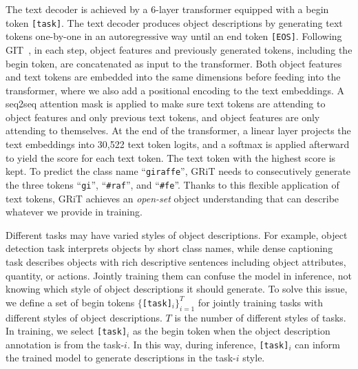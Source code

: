 \documentclass[10pt,twocolumn,letterpaper]{article}
\begin{document}
The text decoder is achieved by a 6-layer transformer equipped with a begin token \texttt{[task]}. The text decoder produces object descriptions by generating text tokens one-by-one in an autoregressive way until an end token \texttt{[EOS]}. Following GIT~\cite{wang2022git}, in each step, object features and previously generated tokens, including the begin token, are concatenated as input to the transformer. Both object features and text tokens are embedded into the same dimensions before feeding into the transformer, where we also add a positional encoding to the text embeddings. A seq2seq attention mask is applied to make sure text tokens are attending to object features and only previous text tokens, and object features are only attending to themselves.  At the end of the transformer, a linear layer projects the text embeddings into 30,522 text token logits, and a softmax is applied afterward to yield the score for each text token. The text token with the highest score is kept. To predict the class name ``\texttt{giraffe}'', GRiT needs to consecutively generate the three tokens ``\texttt{gi}'', ``\texttt{\#raf}'', and ``\texttt{\#fe}''. Thanks to this flexible application of text tokens, GRiT achieves an \emph{open-set} object understanding that can describe whatever we provide in training. 

Different tasks may have varied styles of object descriptions. For example, object detection task interprets objects by short class names, while dense captioning task describes objects with rich descriptive sentences including object attributes, quantity, or actions. Jointly training them can confuse the model in inference, not knowing which style of object descriptions it should generate. To solve this issue, we define a set of begin tokens $\{$\texttt{[task]}$_i\}_{i=1}^{T}$ for jointly training tasks with different styles of object descriptions. $T$ is the number of different styles of tasks. In training, we select \texttt{[task]}$_i$ as the begin token when the object description annotation is from the task-$i$. In this way, during inference, \texttt{[task]}$_i$ can inform the trained model to generate descriptions in the task-$i$ style. 
\end{document}
